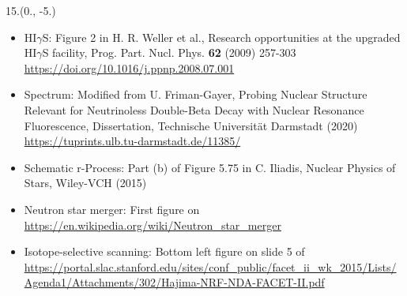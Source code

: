 \begin{textblock}{15.}(0., -5.)
    \begin{itemize}
        \item HI$\gamma$S: Figure 2 in H. R. Weller et al., Research opportunities at the upgraded HI$\gamma$S facility, Prog. Part. Nucl. Phys. \textbf{62} (2009) 257-303 \url{https://doi.org/10.1016/j.ppnp.2008.07.001}
        \item Spectrum: Modified from U. Friman-Gayer, Probing Nuclear Structure Relevant for Neutrinoless Double-Beta Decay with Nuclear Resonance Fluorescence, Dissertation, Technische Universit\"at Darmstadt (2020) \url{https://tuprints.ulb.tu-darmstadt.de/11385/}
        \item Schematic r-Process: Part (b) of Figure 5.75 in C. Iliadis, Nuclear Physics of Stars, Wiley-VCH (2015)
        \item Neutron star merger: First figure on \url{https://en.wikipedia.org/wiki/Neutron_star_merger}
        \item Isotope-selective scanning: Bottom left figure on slide 5 of \url{https://portal.slac.stanford.edu/sites/conf_public/facet_ii_wk_2015/Lists/Agenda1/Attachments/302/Hajima-NRF-NDA-FACET-II.pdf}
    \end{itemize}
\end{textblock}